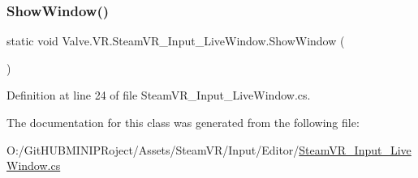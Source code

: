 \subsubsection{\texorpdfstring{ShowWindow()}{ShowWindow()}}
{\footnotesize\ttfamily static void Valve.\+V\+R.\+Steam\+V\+R\+\_\+\+Input\+\_\+\+Live\+Window.\+Show\+Window (\begin{DoxyParamCaption}{ }\end{DoxyParamCaption})\hspace{0.3cm}{\ttfamily [static]}}



Definition at line 24 of file Steam\+V\+R\+\_\+\+Input\+\_\+\+Live\+Window.\+cs.



The documentation for this class was generated from the following file\+:\begin{DoxyCompactItemize}
\item 
O\+:/\+Git\+H\+U\+B\+M\+I\+N\+I\+P\+Roject/\+Assets/\+Steam\+V\+R/\+Input/\+Editor/\mbox{\hyperlink{_steam_v_r___input___live_window_8cs}{Steam\+V\+R\+\_\+\+Input\+\_\+\+Live\+Window.\+cs}}\end{DoxyCompactItemize}
